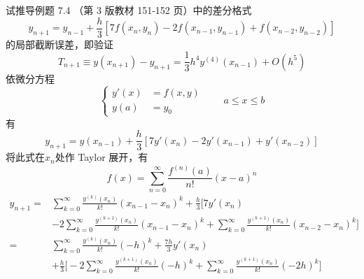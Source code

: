 \documentclass[11pt]{article}
\begin{document}
\maketitle

\thispagestyle{empty}

\newpage

\begin{question}

    \questiontext
    {
        试推导例题 7.4 （第 3 版教材 151-152 页）中的差分格式
        $$
            y_{n + 1} = y_{n - 1} + \frac{h}{3}\left[7f(x_{n}, y_{n}) - 2f(x_{n - 1}, y_{n - 1}) + f(x_{n - 2}, y_{n - 2})\right]
        $$
        的局部截断误差，即验证
        \begin{equation*}
            T_{n + 1} \equiv y(x_{n + 1}) - y_{n + 1} = \frac{1}{3}h^4y^{(4)}(x_{n - 1}) + O(h^5)
        \end{equation*}
    }
    \answer
    {
    依微分方程
    \begin{equation*}
        \left\{
        \begin{aligned}
            y'(x) & = f(x, y) \\
            y(a)  & = y_0
        \end{aligned}
        \right.
        \qquad a \leqslant x \leqslant b
    \end{equation*}
    有
    \begin{equation*}
        y_{n + 1} = y(x_{n - 1}) + \frac{h}{3}\left[7y'(x_{n}) - 2y'(x_{n - 1}) + y'(x_{n - 2})\right]
    \end{equation*}
    将此式在$x_n$处作 Taylor 展开，有
    $$
        f(x) = \displaystyle \sum _{n=0}^{\infty }{\frac {f^{(n)}(a)}{n!}}(x-a)^{n}
    $$
    \begin{align*}
        y_{n + 1} = & \sum_{k = 0}^{\infty}\frac{y^{(k)}(x_{n})}{k!}(x_{n - 1} - x_{n})^k + \frac{h}{3}\Bigg[7y'(x_{n})                                                                            \\
                    & - 2\sum_{k = 0}^{\infty}\frac{y^{(k + 1)}(x_{n})}{k!}(x_{n - 1} - x_{n})^k + \sum_{k = 0}^{\infty}\frac{y^{(k + 1)}(x_{n})}{k!}(x_{n - 2} - x_{n})^k\Bigg]                   \\
        =           & \sum_{k = 0}^{\infty}\frac{y^{(k)}(x_{n})}{k!}(-h)^k + \frac{7h}{3}y'(x_{ n})                                                                                                \\
                    & + \frac{h}{3}\Bigg[- 2\sum_{k = 0}^{\infty}\frac{y^{(k + 1)}(x_{n})}{k!}(-h)^k + \sum_{k = 0}^{\infty}\frac{y^{(k + 1)}(x_{n})}{k!}(-2h)^k\Bigg]                             \\

\end{align*}}
\end{question}
\end{document}
